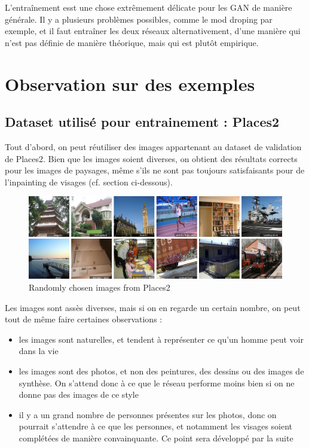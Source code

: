 \documentclass[12pt]{article}
\begin{document}
L'entraînement esst une chose extrêmement délicate pour les GAN de manière générale. Il y a plusieurs problèmes possibles, comme le mod droping par exemple, et il faut entraîner les deux réseaux alternativement, d'une manière qui n'est pas définie de manière théorique, mais qui est plutôt empirique.

\section{Observation sur des exemples}

\subsection{Dataset utilisé pour entrainement : Places2}

Tout d'abord, on peut réutiliser des images appartenant au dataset de validation de Places2. Bien que les images soient diverses, on obtient des résultats corrects pour les images de paysages, même s'ils ne sont pas toujours satisfaisants pour de l'inpainting de visages (cf. section ci-dessous).

\begin{figure}[H]
    \includegraphics[width=1.0\textwidth]{Images/Places2.png}
    \caption{Randomly chosen images from Places2}
\end{figure}

Les images sont assès diverses, mais si on en regarde un certain nombre, on peut tout de même faire certaines observations : 
\begin{itemize}
\item les images sont naturelles, et tendent à représenter ce qu'un homme peut voir dans la vie
\item les images sont des photos, et non des peintures, des dessins ou des images de synthèse. On s'attend donc à ce que le réseau performe moins bien si on ne donne pas des images de ce style
\item il y a un grand nombre de personnes présentes sur les photos, donc on pourrait s'attendre à ce que les personnes, et notamment les visages soient complétées de manière convainquante.  Ce point sera développé par la suite
\end{itemize}
\end{document}
